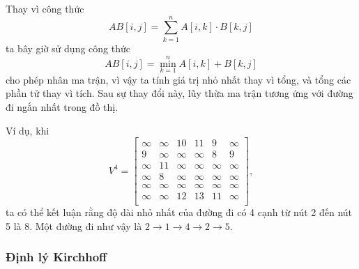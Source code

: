 Thay vì công thức
\[
AB[i,j] = \sum_{k=1}^n A[i,k] \cdot B[k,j]
\]
ta bây giờ sử dụng công thức
\[
AB[i,j] = \min_{k=1}^n A[i,k] + B[k,j]
\]
cho phép nhân ma trận, vì vậy ta tính
giá trị nhỏ nhất thay vì tổng,
và tổng các phần tử thay vì tích.
Sau sự thay đổi này,
lũy thừa ma trận tương ứng với
đường đi ngắn nhất trong đồ thị.

Ví dụ, khi
\[
V^4= \begin{bmatrix}
  \infty & \infty & 10 & 11 & 9 & \infty \\
  9 & \infty & \infty & \infty & 8 & 9 \\
  \infty & 11 & \infty & \infty & \infty & \infty \\
  \infty & 8 & \infty & \infty & \infty & \infty \\
  \infty & \infty & \infty & \infty & \infty & \infty \\
  \infty & \infty & 12 & 13 & 11 & \infty \\
 \end{bmatrix},
\]
ta có thể kết luận rằng độ dài nhỏ nhất của đường đi
có 4 cạnh
từ nút 2 đến nút 5 là 8.
Một đường đi như vậy là
$2 \rightarrow 1 \rightarrow 4 \rightarrow 2 \rightarrow 5$.

\subsubsection{Định lý Kirchhoff}


